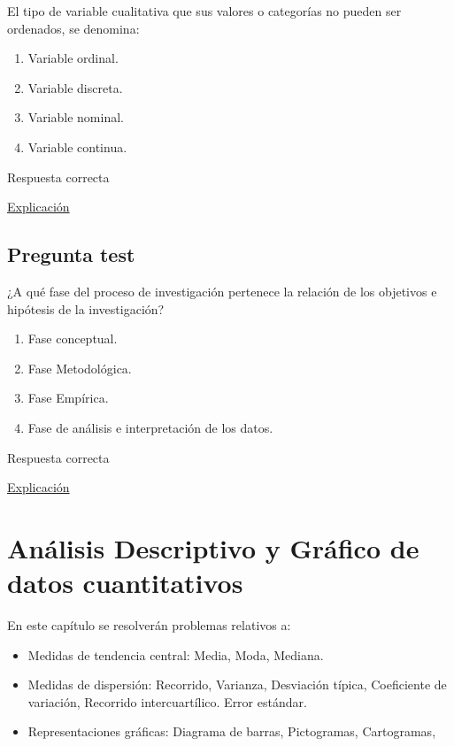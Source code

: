 \documentclass[
]{book}
\providecommand{\tightlist}{%
  \setlength{\itemsep}{0pt}\setlength{\parskip}{0pt}}
\begin{document}
El tipo de variable cualitativa que sus valores o categorías no pueden ser ordenados, se denomina:

\begin{enumerate}
\def\labelenumi{\alph{enumi})}
\tightlist
\item
  Variable ordinal.
\item
  Variable discreta.
\item
  Variable nominal.
\item
  Variable continua.
\end{enumerate}

Respuesta correcta

\href{https://1fjmanzano.github.io/bioestadistica/tipos-de-variables.html}{Explicación}

\hypertarget{pregunta-test-23}{%
\section{Pregunta test}\label{pregunta-test-23}}

¿A qué fase del proceso de investigación pertenece la relación de los objetivos e hipótesis de la investigación?

\begin{enumerate}
\def\labelenumi{\alph{enumi})}
\tightlist
\item
  Fase conceptual.
\item
  Fase Metodológica.
\item
  Fase Empírica.
\item
  Fase de análisis e interpretación de los datos.
\end{enumerate}

Respuesta correcta

\href{https://www.salusplay.com/apuntes/apuntes-metodologia-de-la-investigacion/tema-4-el-proceso-de-investigacion-fases-de-realizacion-de-una-investigacion-cientifica/2}{Explicación}

\hypertarget{anuxe1lisis-descriptivo-y-gruxe1fico-de-datos-cuantitativos}{%
\chapter{Análisis Descriptivo y Gráfico de datos cuantitativos}\label{anuxe1lisis-descriptivo-y-gruxe1fico-de-datos-cuantitativos}}

En este capítulo se resolverán problemas relativos a:

\begin{itemize}
\tightlist
\item
  Medidas de tendencia central: Media, Moda, Mediana.
\item
  Medidas de dispersión: Recorrido, Varianza, Desviación típica, Coeficiente de variación, Recorrido intercuartílico. Error estándar.
\item
  Representaciones gráficas: Diagrama de barras, Pictogramas, Cartogramas,
\end{itemize}
\end{document}
